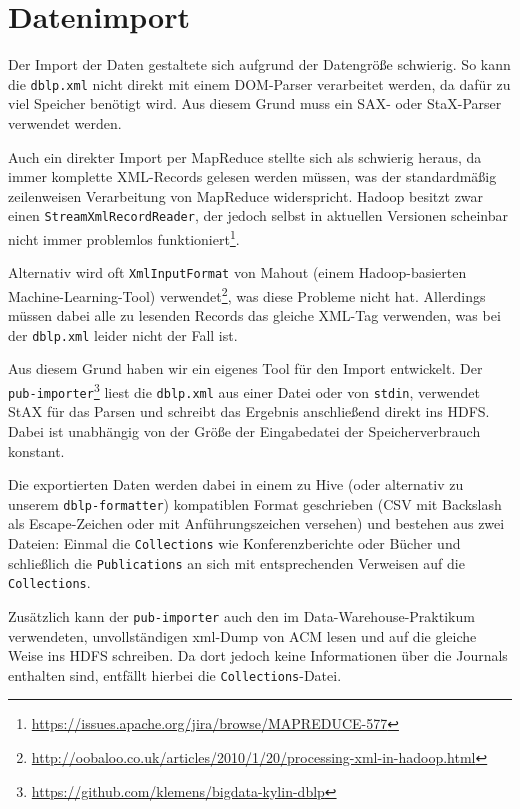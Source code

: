 \documentclass[a4paper,11pt,utf8]{scrartcl}
\begin{document}
\section{Datenimport}

Der Import der Daten gestaltete sich aufgrund der Datengröße schwierig. So kann die \texttt{dblp.xml} nicht direkt mit einem DOM-Parser verarbeitet werden, da dafür zu viel Speicher benötigt wird. Aus diesem Grund muss ein SAX- oder StaX-Parser verwendet werden.

Auch ein direkter Import per MapReduce stellte sich als schwierig heraus, da immer komplette XML-Records gelesen werden müssen, was der standardmäßig zeilenweisen Verarbeitung von MapReduce widerspricht. Hadoop besitzt zwar einen \texttt{StreamXmlRecordReader}, der jedoch selbst in aktuellen Versionen scheinbar nicht immer problemlos funktioniert\footnote{\url{https://issues.apache.org/jira/browse/MAPREDUCE-577}}.

Alternativ wird oft \texttt{XmlInputFormat} von Mahout (einem Hadoop-basierten Machine-Learning-Tool) verwendet\footnote{\url{http://oobaloo.co.uk/articles/2010/1/20/processing-xml-in-hadoop.html}}, was diese Probleme nicht hat. Allerdings müssen dabei alle zu lesenden Records das gleiche XML-Tag verwenden, was bei der \texttt{dblp.xml} leider nicht der Fall ist.

Aus diesem Grund haben wir ein eigenes Tool für den Import entwickelt. Der \texttt{pub-importer}\footnote{\url{https://github.com/klemens/bigdata-kylin-dblp}} liest die \texttt{dblp.xml} aus einer Datei oder von \texttt{stdin}, verwendet StAX für das Parsen und schreibt das Ergebnis anschließend direkt ins HDFS. Dabei ist unabhängig von der Größe der Eingabedatei der Speicherverbrauch konstant.

Die exportierten Daten werden dabei in einem zu Hive (oder alternativ zu unserem \texttt{dblp-formatter}) kompatiblen Format geschrieben (CSV mit Backslash als Escape-Zeichen oder mit Anführungszeichen versehen) und bestehen aus zwei Dateien: Einmal die \texttt{Collections} wie Konferenzberichte oder Bücher und schließlich die \texttt{Publications} an sich mit entsprechenden Verweisen auf die \texttt{Collections}.

Zusätzlich kann der \texttt{pub-importer} auch den im Data-Warehouse-Praktikum verwendeten, unvollständigen xml-Dump von ACM lesen und auf die gleiche Weise ins HDFS schreiben. Da dort jedoch keine Informationen über die Journals enthalten sind, entfällt hierbei die \texttt{Collections}-Datei.
\end{document}
